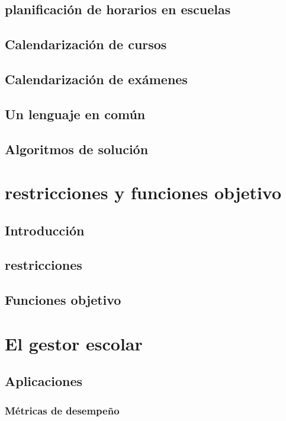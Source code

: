 \documentclass[draft,12pt,headsepline,footsepline,paper=letter]{scrreprt}
\begin{document}
\section{planificación de horarios en escuelas}

\section{Calendarización de cursos}

\section{Calendarización de exámenes}

\section{Un lenguaje en común}

\section{Algoritmos de solución}

\chapter{restricciones y funciones objetivo}

\section{Introducción}

\section{restricciones}

\section{Funciones objetivo}

\chapter{El gestor escolar}

\section{Aplicaciones}

\subsection{Métricas de desempeño}
\end{document}
